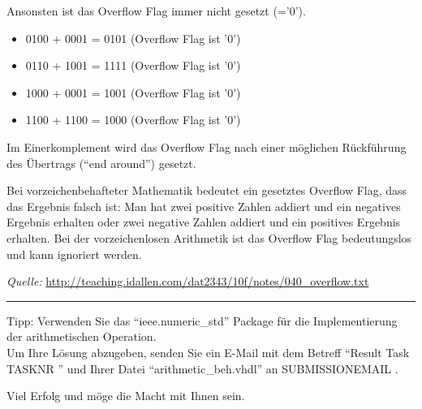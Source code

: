 \documentclass[a4paper,12pt]{article}
\begin{document}
Ansonsten ist das Overflow Flag immer nicht gesetzt (='0').
\begin{itemize}
\item 0100 + 0001 = 0101 (Overflow Flag ist '0')
\item 0110 + 1001 = 1111 (Overflow Flag ist '0')
\item 1000 + 0001 = 1001 (Overflow Flag ist '0')
\item 1100 + 1100 = 1000 (Overflow Flag ist '0')
\end{itemize}

Im Einerkomplement wird das Overflow Flag nach einer m\"oglichen R\"uckf\"uhrung des \"Ubertrags ("`end around"') gesetzt.

Bei vorzeichenbehafteter Mathematik bedeutet ein gesetztes Overflow Flag, dass das Ergebnis falsch ist: Man hat zwei positive Zahlen addiert und ein negatives Ergebnis erhalten oder zwei negative Zahlen addiert und ein positives Ergebnis erhalten. Bei der vorzeichenlosen Arithmetik ist das Overflow Flag bedeutungslos und kann ignoriert werden.

\vspace{0.5cm}
\textit{Quelle: }\url{http://teaching.idallen.com/dat2343/10f/notes/040_overflow.txt}
\\
\rule{16cm}{0.4pt}

\vspace{0.3cm}

Tipp: Verwenden Sie das "`ieee.numeric\_std"' Package f\"ur die Implementierung der arithmetischen Operation.
\\

Um Ihre L\"osung abzugeben, senden Sie ein E-Mail mit dem Betreff "`Result Task {{ TASKNR }}"' und Ihrer Datei "`arithmetic\_beh.vhdl"'  an {{ SUBMISSIONEMAIL }}.

\vspace{0.7cm}

Viel Erfolg und m\"oge die Macht mit Ihnen sein.
\end{document}
